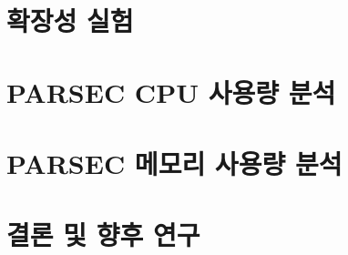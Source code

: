 \documentclass{kcc}
\begin{document}
\section{확장성 실험}


\section{PARSEC CPU 사용량 분석}


\section{PARSEC 메모리 사용량 분석}


\section{결론 및 향후 연구}



\end{document}
